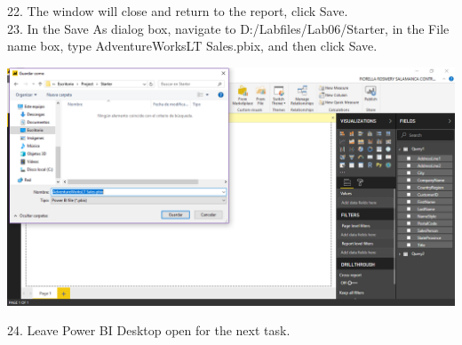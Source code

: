 22. The window will close and return to the report, click Save.\\
23. In the Save As dialog box, navigate to D:/Labfiles/Lab06/Starter, in the File name box, type AdventureWorksLT Sales.pbix, and then click Save.\\

	\begin{center}
	\includegraphics[width=17cm]{./Imagenes/Ejercicio1/Tarea2/10}
	\end{center}	

24. Leave Power BI Desktop open for the next task.\\